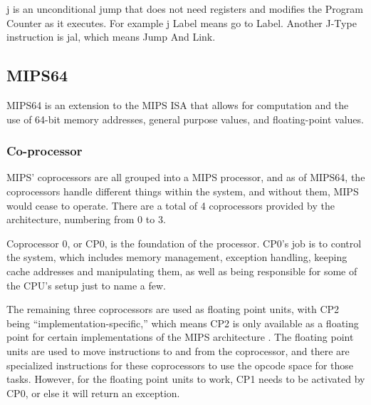 \documentclass[
    paper=letter,
    parskip=half,
    fontsize=12pt,
    titlepage=firstiscover,
    toc=bibliography,
    numbers=endperiod
]{scrartcl}
\begin{document}
j is an unconditional jump that does not need registers and modifies the
Program Counter as it executes. For example j Label means go to Label.
Another J-Type instruction is jal, which means Jump And Link.

\subsection{MIPS64}
\label{sec:mips64}

MIPS64 is an extension to the MIPS ISA that allows for computation and
the use of 64-bit memory addresses, general purpose values, and
floating-point values.

\subsubsection{Co-processor}

MIPS' coprocessors are all grouped into a MIPS processor, and as of
MIPS64, the coprocessors handle different things within the system, and
without them, MIPS would cease to operate. There are a total of 4
coprocessors provided by the architecture, numbering from 0 to 3.

Coprocessor 0, or CP0, is the foundation of the processor. CP0's job is
to control the system, which includes memory management, exception
handling, keeping cache addresses and manipulating them, as well as
being responsible for some of the CPU's setup just to name a few.

The remaining three coprocessors are used as floating point units, with
CP2 being ``implementation-specific,'' which means CP2 is only available
as a floating point for certain implementations of the MIPS
architecture \cite[p.~74]{mips-specification}. The floating point units are used to move instructions to
and from the coprocessor, and there are specialized instructions for
these coprocessors to use the opcode space for those tasks. However, for
the floating point units to work, CP1 needs to be activated by CP0, or
else it will return an exception.




\end{document}
